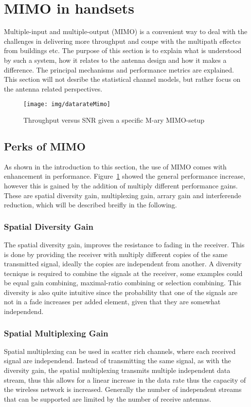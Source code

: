 \section{MIMO in handsets} %
\label{sec:mimo_in_handsets}
Multiple-input and multiple-output (MIMO) is a convenient way to deal with the challenges in delivering more throughput and coupe with the multipath effectcs from buildings etc. The purpose of this section is to explain what is understood by such a system, how it relates to the antenna design and how it makes a difference. The principal mechanisms and performance metrics are explained. This section will not desribe the statistical channel models, but rather focus on the antenna related perspectives. 

\begin{figure}[htbp]
  \centering
  \texttt{[image: img/datarateMimo]}
  \caption{Throughput versus SNR given a specific M-ary MIMO-setup\cite{Ezio2007MIMO}}
  \label{fig:mimo-throughput}
\end{figure}

\subsection{Perks of MIMO} 
As shown in the introduction to this section, the use of MIMO comes with enhancement in performance. Figure~\ref{fig:mimo-throughput} showed the general performance increase, however this is gained by the addition of multiply different performance gains. These are spatial diversity gain, multiplexing gain, arrary gain and interferende reduction\cite{Ezio2007MIMO}, which will be described breifly in the following.


\subsubsection{Spatial Diversity Gain}
The spatial diversity gain, improves the resistance to fading in the receiver. This is done by providing the receiver with multiply different copies of the same transmitted signal, ideally the copies are independent from another. A diversity tecnique is required to combine the signals at the receiver\cite{Ezio2007MIMO}, some examples could be equal gain combining, maximal-ratio combining or selection combining. This diversity is also quite intuitive since the probability that one of the signals are not in a fade increases per added element, given that they are somewhat independend. 
 
\subsubsection{Spatial Multiplexing Gain}
Spatial multiplexing can be used in scatter rich channels, where each received signal are independend. Instead of transmitting the same signal, as with the diversity gain, the spatial multiplexing transmits multiple independent data stream, thus this allows for a linear increase in the data rate thus the capacity of the wireless network is increased. Generally the number of independent streams that can be supported are limited by the number of receive antennas. 

